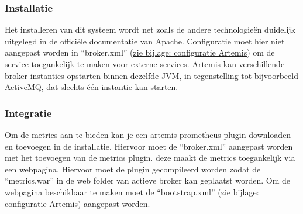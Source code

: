 \subsubsection{Installatie}
Het installeren van dit systeem wordt net zoals de andere technologieën duidelijk uitgelegd in de officiële documentatie van Apache.
Configuratie moet hier niet aangepast worden in ``broker.xml'' (\hyperref[listing:broker_artemis]{zie bijlage: configuratie Artemis}) om de service toegankelijk te maken voor externe services.
Artemis kan verschillende broker instanties opstarten binnen dezelfde JVM, in tegenstelling tot bijvoorbeeld ActiveMQ, dat slechts één instantie kan starten.

\subsubsection{Integratie}
Om de metrics aan te bieden kan je een artemis-prometheus plugin downloaden en toevoegen in de installatie.
Hiervoor moet de ``broker.xml'' aangepast worden met het toevoegen van de metrics plugin.
deze maakt de metrics toegankelijk via een webpagina.
Hiervoor moet de plugin gecompileerd worden zodat de ``metrics.war'' in de web folder van actieve broker kan geplaatst worden.
Om de webpagina beschikbaar te maken moet de ``bootstrap.xml'' (\hyperref[listing:bootstrap_artemis]{zie bijlage: configuratie Artemis}) aangepast worden.

